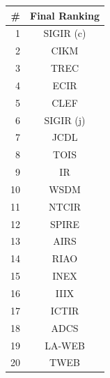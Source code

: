 \documentclass[msc]{ppgccufmg}
\begin{document}
\begin{table}[htbp]
\begin{tabular}{rc}
\toprule
\#		&	Final Ranking \\ 
\midrule
1		&	SIGIR (c)	\\
2		&	CIKM		\\
3		&	TREC		\\
4		&	ECIR		\\
5		&	CLEF		\\
6		&	SIGIR (j)	\\
7		&	JCDL		\\
8		&	TOIS		\\
9		&	IR			\\
10		&	WSDM		\\
11		&	NTCIR		\\
12		&	SPIRE		\\
13		&	AIRS		\\
14		&	RIAO		\\
15		&	INEX		\\
16		&	IIIX		\\
17		&	ICTIR		\\
18		&	ADCS		\\
19		&	LA-WEB		\\
20		&	TWEB		\\
\bottomrule
\end{tabular}
\end{table}
\end{document}
